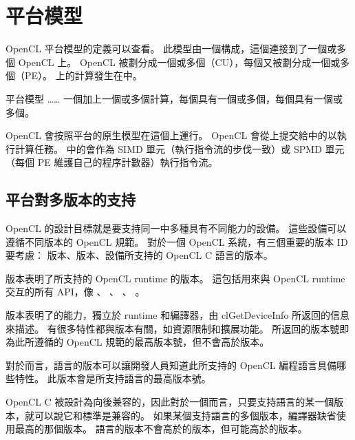 \section{平台模型}

OpenCL 平台模型的定義可以查看。
此模型由一個構成，這個連接到了一個或多個 {\ftEmpha OpenCL} 上。
OpenCL 被劃分成一個或多個（CU），每個又被劃分成一個或多個（PE）。
上的計算發生在中。

\startbuffer[buffigplfmodelcaption]
平台模型 …… 一個加上一個或多個計算，每個具有一個或多個，每個具有一個或多個。
\stopbuffer
{}
{}

OpenCL 會按照平台的原生模型在這個上運行。
OpenCL 會從上提交給中的以執行計算任務。
中的會作為 SIMD 單元（執行指令流的步伐一致）或 SPMD 單元（每個 PE 維護自己的程序計數器）執行指令流。

\subsection{平台對多版本的支持}
OpenCL 的設計目標就是要支持同一中多種具有不同能力的設備。
這些設備可以遵循不同版本的 OpenCL 規範。
對於一個 OpenCL 系統，有三個重要的版本 ID 要考慮：
版本、版本、設備所支持的 OpenCL C 語言的版本。

版本表明了所支持的 OpenCL runtime 的版本。
這包括用來與 OpenCL runtime 交互的所有 API，像 、 、 、 。

版本表明了的能力，獨立於 runtime 和編譯器，由 {\ftCEmpha clGetDeviceInfo} 所返回的信息來描述。
有很多特性都與版本有關，如資源限制和擴展功能。
所返回的版本號即為此所遵循的 OpenCL 規範的最高版本號，但不會高於版本。

對於而言，語言的版本可以讓開發人員知道此所支持的 OpenCL 編程語言具備哪些特性。
此版本會是所支持語言的最高版本號。

OpenCL C 被設計為向後兼容的，因此對於一個而言，只要支持語言的某一個版本，就可以說它和標準是兼容的。
如果某個支持語言的多個版本，編譯器缺省使用最高的那個版本。
語言的版本不會高於的版本，但可能高於的版本。


